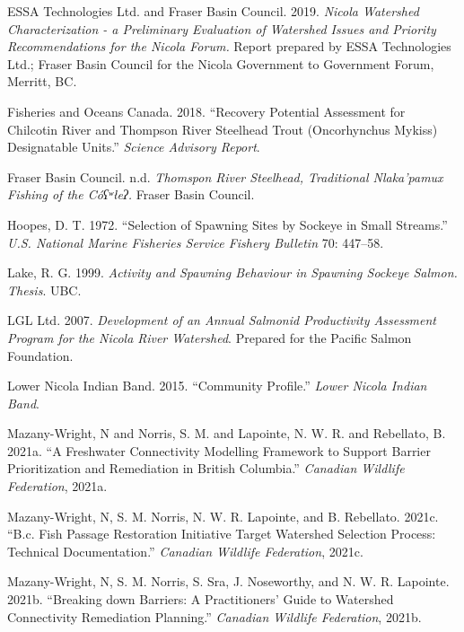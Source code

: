 \documentclass[
  letterpaper,
  DIV=11,
  numbers=noendperiod]{scrreprt}
\newlength{\cslhangindent}
\newlength{\cslentryspacingunit} %
\newenvironment{CSLReferences}[2] %
 {%
  \setlength{\parindent}{0pt}
  \ifodd #1
  \let\oldpar\par
  \def\par{\hangindent=\cslhangindent\oldpar}
  \fi
  \setlength{\parskip}{#2\cslentryspacingunit}
 }%
 {}
\begin{document}
\begin{CSLReferences}{1}{0}
\leavevmode{}%
ESSA Technologies Ltd. and Fraser Basin Council. 2019. \emph{Nicola
Watershed Characterization - a Preliminary Evaluation of Watershed
Issues and Priority Recommendations for the Nicola Forum.} Report
prepared by ESSA Technologies Ltd.; Fraser Basin Council for the Nicola
Government to Government Forum, Merritt, BC.

\leavevmode{}%
Fisheries and Oceans Canada. 2018. {``Recovery Potential Assessment for
Chilcotin River and Thompson River Steelhead Trout (Oncorhynchus Mykiss)
Designatable Units.''} \emph{Science Advisory Report}.

\leavevmode{}%
Fraser Basin Council. n.d. \emph{Thomspon River Steelhead, Traditional
Nlaka'pamux Fishing of the Cóʕʷłeʔ.} Fraser Basin Council.

\leavevmode{}%
Hoopes, D. T. 1972. {``Selection of Spawning Sites by Sockeye in Small
Streams.''} \emph{U.S. National Marine Fisheries Service Fishery
Bulletin} 70: 447--58.

\leavevmode{}%
Lake, R. G. 1999. \emph{Activity and Spawning Behaviour in Spawning
Sockeye Salmon. Thesis}. UBC.

\leavevmode{}%
LGL Ltd. 2007. \emph{Development of an Annual Salmonid Productivity
Assessment Program for the Nicola River Watershed}. Prepared for the
Pacific Salmon Foundation.

\leavevmode{}%
Lower Nicola Indian Band. 2015. {``Community Profile.''} \emph{Lower
Nicola Indian Band}.

\leavevmode{}%
Mazany-Wright, N and Norris, S. M. and Lapointe, N. W. R. and Rebellato,
B. 2021a. {``A Freshwater Connectivity Modelling Framework to Support
Barrier Prioritization and Remediation in British Columbia.''}
\emph{Canadian Wildlife Federation}, 2021a.

\leavevmode{}%
Mazany-Wright, N, S. M. Norris, N. W. R. Lapointe, and B. Rebellato.
2021c. {``B.c. Fish Passage Restoration Initiative Target Watershed
Selection Process: Technical Documentation.''} \emph{Canadian Wildlife
Federation}, 2021c.

\leavevmode{}%
Mazany-Wright, N, S. M. Norris, S. Sra, J. Noseworthy, and N. W. R.
Lapointe. 2021b. {``Breaking down Barriers: A Practitioners' Guide to
Watershed Connectivity Remediation Planning.''} \emph{Canadian Wildlife
Federation}, 2021b.


\end{CSLReferences}
\end{document}
